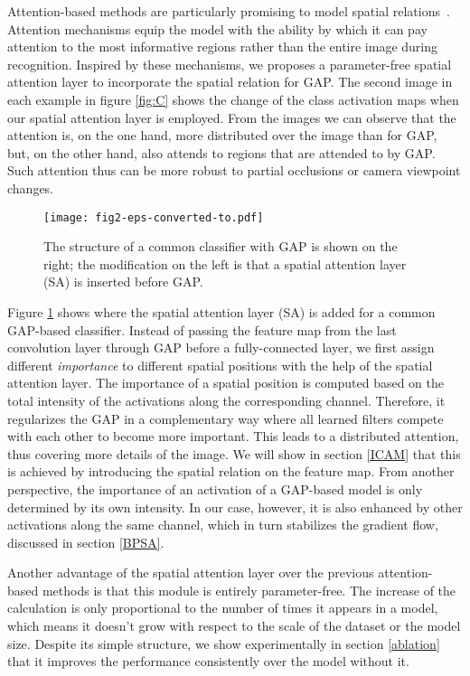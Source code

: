 \documentclass[10pt,twocolumn,letterpaper]{article}
\begin{document}
Attention-based methods are particularly promising to model spatial relations~\cite{atten_reid_harm, atten_reid_harm1, atten_reid_harm2, atten_reid_harm3, atten_reid_harm4, atten_reid_harm5}. Attention mechanisms \cite{attention_origin} equip the model with the ability by which it can pay attention to the most informative regions rather than the entire image during  recognition. Inspired by these mechanisms, we proposes a parameter-free spatial attention layer to incorporate the spatial relation for GAP. The second image in each example in figure \ref{fig:C} shows the change of the class activation maps when our spatial attention layer is employed. From the images we can observe that the attention is, on the one hand, more distributed over the image than for GAP, but, on the other hand, also attends to regions that are attended to by GAP. Such attention thus can be more robust to partial occlusions or camera viewpoint changes.

\begin{figure}[!ht]
  \centering
  \texttt{[image: fig2-eps-converted-to.pdf]}
  \caption{The structure of a common classifier with GAP is shown on the right; the modification on the left is that a spatial attention layer (SA) is inserted before GAP.}
  \label{fig:overall_sa_gap}
\end{figure}

Figure \ref{fig:overall_sa_gap} shows where the spatial attention layer (SA) is added for a common GAP-based classifier. Instead of passing the feature map from the last convolution layer through GAP before a fully-connected layer, we first assign different \textit{importance} to different spatial positions with the help of the spatial attention layer. The importance of a spatial position is computed based on the total intensity of the activations along the corresponding channel. Therefore, it regularizes the GAP in a complementary way where all learned filters compete with each other to become more important. This leads to a distributed attention, thus covering more details of the image. We will show in section \ref{ICAM} that this is achieved by introducing the spatial relation on the feature map. From another perspective, the importance of an activation of a GAP-based model is only determined by its own intensity. In our case, however, it is also enhanced by other activations along the same channel, which in turn stabilizes the gradient flow, discussed in section \ref{BPSA}.

Another advantage of the spatial attention layer over the previous attention-based methods is that this module is entirely parameter-free. The increase of the calculation is only proportional to the number of times it appears in a model, which means it doesn't grow with respect to the scale of the dataset or the model size. Despite its simple structure, we show  experimentally in  section \ref{ablation} that it improves the performance consistently over the model without it.
\end{document}
